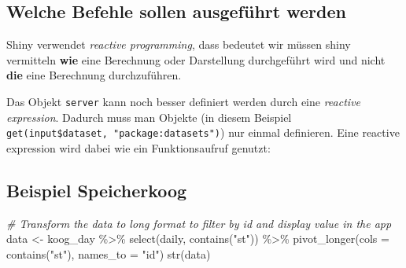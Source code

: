 \documentclass[
]{article}
\newenvironment{Shaded}{\begin{snugshade}}{\end{snugshade}}
\newcommand{\AttributeTok}[1]{\textcolor[rgb]{0.77,0.63,0.00}{#1}}
\newcommand{\CommentTok}[1]{\textcolor[rgb]{0.56,0.35,0.01}{\textit{#1}}}
\newcommand{\ControlFlowTok}[1]{\textcolor[rgb]{0.13,0.29,0.53}{\textbf{#1}}}
\newcommand{\FunctionTok}[1]{\textcolor[rgb]{0.00,0.00,0.00}{#1}}
\newcommand{\NormalTok}[1]{#1}
\newcommand{\OtherTok}[1]{\textcolor[rgb]{0.56,0.35,0.01}{#1}}
\newcommand{\SpecialCharTok}[1]{\textcolor[rgb]{0.00,0.00,0.00}{#1}}
\newcommand{\StringTok}[1]{\textcolor[rgb]{0.31,0.60,0.02}{#1}}
\begin{document}
\hypertarget{welche-befehle-sollen-ausgefuxfchrt-werden}{%
\subsection{Welche Befehle sollen ausgeführt werden}\label{welche-befehle-sollen-ausgefuxfchrt-werden}}

Shiny verwendet \emph{reactive programming}, dass bedeutet wir müssen shiny vermitteln \textbf{wie} eine Berechnung oder Darstellung durchgeführt wird und nicht \textbf{die} eine Berechnung durchzuführen.

\begin{Shaded}
\end{Shaded}

Das Objekt \texttt{server} kann noch besser definiert werden durch eine \emph{reactive expression}. Dadurch muss man Objekte (in diesem Beispiel \texttt{get(input\$dataset,\ "package:datasets")}) nur einmal definieren. Eine reactive expression wird dabei wie ein Funktionsaufruf genutzt:

\hypertarget{beispiel-speicherkoog}{%
\subsection{Beispiel Speicherkoog}\label{beispiel-speicherkoog}}

\begin{Shaded}
\begin{Highlighting}[]
\CommentTok{\# Transform the data to long format to filter by id and display value in the app}
\NormalTok{data }\OtherTok{\textless{}{-}}\NormalTok{ koog\_day }\SpecialCharTok{\%\textgreater{}\%}
  \FunctionTok{select}\NormalTok{(daily, }\FunctionTok{contains}\NormalTok{(}\StringTok{"st"}\NormalTok{)) }\SpecialCharTok{\%\textgreater{}\%}
  \FunctionTok{pivot\_longer}\NormalTok{(}\AttributeTok{cols =} \FunctionTok{contains}\NormalTok{(}\StringTok{"st"}\NormalTok{), }\AttributeTok{names\_to =} \StringTok{"id"}\NormalTok{)}
\FunctionTok{str}\NormalTok{(data)}
\end{Highlighting}
\end{Shaded}
\end{document}
